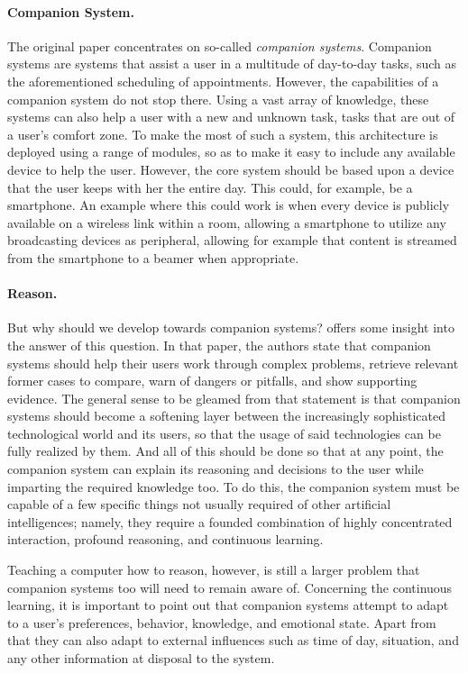 \documentclass[a4paper]{article}
\begin{document}
\paragraph{Companion System.} The original paper concentrates on so-called {\it companion systems}. Companion systems are systems that assist a user in a multitude of day-to-day tasks, such as the aforementioned scheduling of appointments. However, the capabilities of a companion system do not stop there. Using a vast array of knowledge, these systems can also help a user with a new and unknown task, tasks that are out of a user's comfort zone. To make the most of such a system, this architecture is deployed using a range of modules, so as to make it easy to include any available device to help the user. However, the core system should be based upon a device that the user keeps with her the entire day. This could, for example, be a smartphone. An example where this could work is when every device is publicly available on a wireless link within a room, allowing a smartphone to utilize any broadcasting devices as peripheral, allowing for example that content is streamed from the smartphone to a beamer when appropriate.

\paragraph{Reason.} But why should we develop towards companion systems? \cite{forbus2006companion} offers some insight into the answer of this question. In that paper, the authors state that companion systems should help their users work through complex problems, retrieve relevant former cases to compare, warn of dangers or pitfalls, and show supporting evidence. The general sense to be gleamed from that statement is that companion systems should become a softening layer between the increasingly sophisticated technological world and its users, so that the usage of said technologies can be fully realized by them. And all of this should be done so that at any point, the companion system can explain its reasoning and decisions to the user while imparting the required knowledge too. To do this, the companion system must be capable of a few specific things not usually required of other artificial intelligences; namely, they require a founded combination of highly concentrated interaction, profound reasoning, and continuous learning.

Teaching a computer how to reason, however, is still a larger problem that companion systems too will need to remain aware of. Concerning the continuous learning, it is important to point out that companion systems attempt to adapt to a user's preferences, behavior, knowledge, and emotional state. Apart from that they can also adapt to external influences such as time of day, situation, and any other information at disposal to the system.
\end{document}
